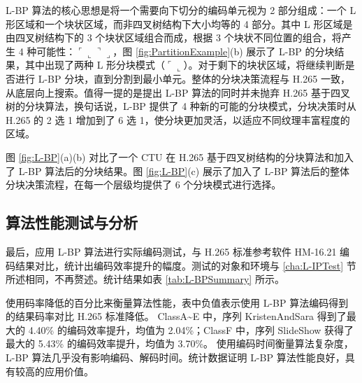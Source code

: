 L-BP 算法的核心思想是将一个需要向下切分的编码单元视为 2 部分组成：一个 L 形区域和一个块状区域，而非四叉树结构下大小均等的 4 部分。其中 L 形区域是由四叉树结构下的 3 个块状区域组合而成，根据 3 个块状不同位置的组合，将产生 4 种可能性：$\ulcorner \llcorner \urcorner \lrcorner$，图 \ref{fig:PartitionExample}(b) 展示了 L-BP 的分块结果，其中出现了两种 L 形分块模式（$\ulcorner \llcorner$）。对于剩下的块状区域，将继续判断是否进行 L-BP 分块，直到分割到最小单元。整体的分块决策流程与 H.265 一致，从底层向上搜索。值得一提的是提出 L-BP 算法的同时并未抛弃 H.265 基于四叉树的分块算法，换句话说，L-BP 提供了 4 种新的可能的分块模式，分块决策时从 H.265 的 2 选 1 增加到了 6 选 1，使分块更加灵活，以适应不同纹理丰富程度的区域。

图 \ref{fig:L-BP}(a)(b) 对比了一个 CTU 在 H.265 基于四叉树结构的分块算法和加入了 L-BP 算法后的分块结果。图 \ref{fig:L-BP}(c) 展示了加入了 L-BP 算法后的整体分块决策流程，在每一个层级均提供了 6 个分块模式进行选择。
\begin{figure}[!p]
\end{figure}

\subsection{算法性能测试与分析}
\label{cha:L-BPTest}
最后，应用 L-BP 算法进行实际编码测试，与 H.265 标准参考软件 HM-16.21 编码结果对比，统计出编码效率提升的幅度。测试的对象和环境与 \ref{cha:L-IPTest} 节所述相同，不再赘述。统计结果如表 \ref{tab:L-BPSummary} 所示。

使用码率降低的百分比来衡量算法性能，表中负值表示使用 L-BP 算法编码得到的结果码率对比 H.265 标准降低。
ClassA\textasciitilde E 中，序列 KristenAndSara 得到了最大的 4.40\% 的编码效率提升，均值为 2.04\%；ClassF 中，序列 SlideShow 获得了最大的 5.43\% 的编码效率提升，均值为 3.70\%。
使用编码时间衡量算法复杂度，L-BP 算法几乎没有影响编码、解码时间。统计数据证明 L-BP 算法性能良好，具有较高的应用价值。

